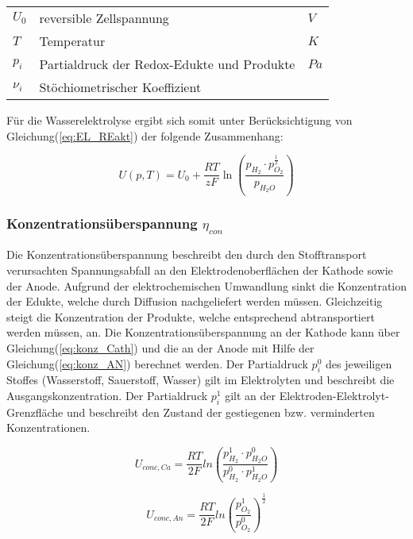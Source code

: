 \documentclass[onecolumn,10pt,titlepage]{article}
\begin{document}
	\begin{table}[H]
		\begin{tabular*}{\textwidth}{lll}\\
			$U_0$&reversible Zellspannung&$V$\\
			$T$&Temperatur&$K$\\
			$p_i$&Partialdruck der Redox-Edukte und Produkte&$Pa$\\
			$\nu_i$&Stöchiometrischer Koeffizient&\\
		\end{tabular*}
	\end{table}

	Für die Wasserelektrolyse ergibt sich somit unter Berücksichtigung von Gleichung(\ref{eq:EL_REakt}) der folgende Zusammenhang:
	
	\begin{equation}
	U(p,T) = U_0 + \frac{RT}{zF}\ln{\left(\frac{p_{H_2}\cdot p_{O_2}^{\frac{1}{2}}}{p_{H_2O}}\right)}
	\label{key}
	\end{equation}
	
	\subsubsection*{Konzentrationsüberspannung $\eta_{con}$}
	Die Konzentrationsüberspannung beschreibt den durch den Stofftransport verursachten Spannungsabfall an den Elektrodenoberflächen der Kathode sowie der Anode.\cite{UniversitatUlm.2016} Aufgrund der elektrochemischen Umwandlung sinkt die Konzentration der Edukte, welche durch Diffusion nachgeliefert werden müssen. Gleichzeitig steigt die Konzentration der Produkte, welche entsprechend abtransportiert werden müssen, an. Die Konzentrationsüberspannung an der Kathode kann über Gleichung(\ref{eq:konz_Cath}) und die an der Anode mit Hilfe der Gleichung(\ref{eq:konz_AN}) berechnet werden.\cite{NI.2007}
	  Der Partialdruck $p_i^0$ des jeweiligen Stoffes (Wasserstoff, Sauerstoff, Wasser) gilt  im Elektrolyten und beschreibt die Ausgangskonzentration. Der Partialdruck $p_i^1$  gilt an der Elektroden-Elektrolyt-Grenzfläche und beschreibt den Zustand der gestiegenen bzw. verminderten Konzentrationen.
	
	\begin{equation}
		U_{conc,Ca} = \frac{RT}{2F}ln{\left(\frac{p_{H_2}^1 \cdot p_{H_2O}^0}{p_{H_2}^0\cdot p_{H_2O}^1}\right)}
		\label{eq:konz_Cath}
	\end{equation}
	
	\begin{equation}
		U_{conc,An} = \frac{RT}{2F}ln{\left(\frac{p_{O_2}^1}{p_{O_2}^0}\right)}^{\frac{1}{2}}
		\label{eq:konz_AN}
	\end{equation}
	
\end{document}
